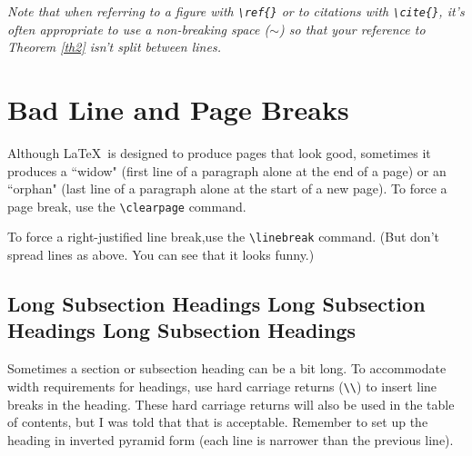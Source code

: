 {\em Note that when referring to a figure with \verb+\ref{}+ or to
citations with \verb+\cite{}+, it's often appropriate to use a
non-breaking space ($\sim$) so that your reference to Theorem \ref{th2} isn't split between lines.
}

\section{Bad Line and Page Breaks}


Although \LaTeX \ is designed to produce pages that look good,
sometimes it produces a ``widow" (first line of a paragraph
alone at the end of a page) or an ``orphan"
(last line of a paragraph alone at the start of a new page).
To force a page break, use the
\verb+\clearpage+ command.

To force a right-justified line break,\linebreak use the
\verb+\linebreak+ command.
(But don't spread lines as above. You can see that it looks funny.)



\subsection{Long Subsection Headings 
Long Subsection \\
Headings 
Long Subsection Headings
}


Sometimes a section or subsection heading can be a bit long.
To accommodate width requirements for headings, 
use hard carriage returns (\verb+\\+)
to insert line breaks in the heading. These hard carriage returns 
will also be used in the table of contents, but 
I was told that that is acceptable. 
Remember to set up the heading in inverted pyramid form
(each line is narrower than the previous line).


